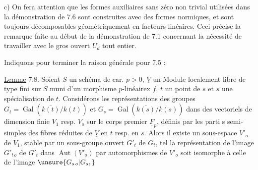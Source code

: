 c) On fera attention que les formes auxiliaires sans zéro non trivial utilisées dans la démonstration de 7.6 sont construites avec des formes normiques, et sont toujours décomposables géométriquement en facteurs linéaires. Ceci précise la remarque faite au début de la démonstration de 7.1 concernant la nécessité de travailler avec le gros ouvert $U_d$ tout entier.

Indiquons pour terminer la raison générale pour 7.5 :

\uline{Lemme} 7.8. Soient $S$ un schéma de car. $p>0$, $\underline{V}$ un Module localement libre de type fini sur $S$ muni d'un morphisme $p$-linéairex $f$, $t$ un point de $s$ et $s$ une spécialisation de $t$. Considérons les représentations des groupes $G_t=\operatorname{Gal}(\overline{k(t)}/k(t))$ et $G_s=\operatorname{Gal}(\overline{k(s)}/k(s))$ dans des vectoriels de dimension finie $V_1$ resp. $V_o$ sur le corps premier $\underline{F}_p$, définis par les parti s semi-simples des fibres  réduites de $\underline{V}$ en $t$ resp. en $s$. Alors il existe un sous-espace $V'_o$ de $V_1$, stable par un sous-groupe ouvert $G'_t$ de $G_t$, tel  la représentation de l'image $G'_{t\,o}$ de $G'_t$ dans  $\operatorname{Aut}(V'_o)$ par automorphismes de $V'_o$ soit isomorphe à celle de l'image $\unsure{G_{s\,o}|G_s,}$

